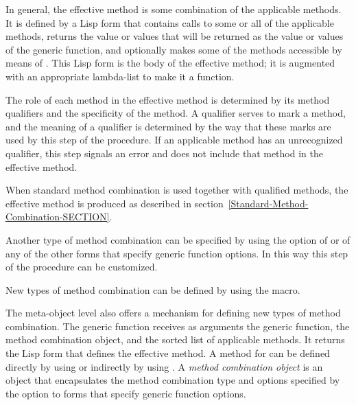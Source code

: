 In general, the effective method is some combination of the applicable
methods.  It is defined by a Lisp form that contains calls to some or all
of the applicable methods, returns the value or values that will be
returned as the value or values of the generic function, and optionally
makes some of the methods accessible by means of .
This Lisp form is the body of the effective method; it is augmented with
an appropriate lambda-list to make it a function.

The role of each method in the effective method is determined by its
method qualifiers and the specificity of the method.  A qualifier
serves to mark a method, and the meaning of a qualifier is
determined by the way that these marks are used by this step
of the procedure.  If an applicable method has an unrecognized
qualifier, this step signals an error and does not include that method
in the effective method.

When standard method combination is used together with qualified methods, 
the effective method is produced as described in
section~\ref{Standard-Method-Combination-SECTION}.

Another type of method combination can be specified by using the 
 option of  or of any of the other
forms that specify generic function options.  In this way this step of
the procedure can be customized.

New types of method combination can be defined by using the 
 macro. 

The meta-object level also offers a mechanism for defining new types
of method combination.  The generic function 
 receives as arguments the generic function,
the method combination object, and the sorted list of applicable
methods.  It returns the Lisp form that defines the effective method.
A method for  can be defined directly by
using  or indirectly by using 
.
A \emph{method combination object} is an
object that encapsulates the method combination type and options
specified by the  option to forms that
specify generic function options.


